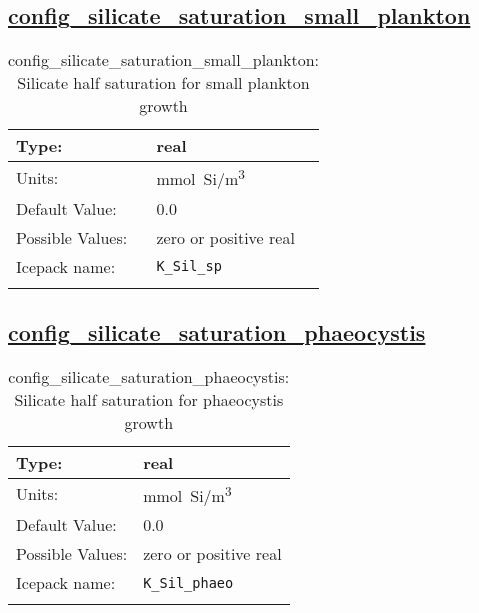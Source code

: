 \subsection[config\_silicate\_saturation\_small\_plankton]{\hyperref[sec:nm_tab_biogeochemistry]{config\_silicate\_saturation\_small\_plankton}}
\label{subsec:nm_sec_config_silicate_saturation_small_plankton}
\begin{center}
\begin{longtable}{| p{2.0in} || p{4.0in} |}
    \hline
    Type: & real \\
    \hline
    Units: & \si{mmol.Si/m^3} \\
    \hline
    Default Value: & 0.0 \\
    \hline
    Possible Values: & zero or positive real \\
    \hline
    Icepack name: & \verb+K_Sil_sp+ \\
    \hline
    \caption{config\_silicate\_saturation\_small\_plankton: Silicate half saturation for small plankton growth}
\end{longtable}
\end{center}
\subsection[config\_silicate\_saturation\_phaeocystis]{\hyperref[sec:nm_tab_biogeochemistry]{config\_silicate\_saturation\_phaeocystis}}
\label{subsec:nm_sec_config_silicate_saturation_phaeocystis}
\begin{center}
\begin{longtable}{| p{2.0in} || p{4.0in} |}
    \hline
    Type: & real \\
    \hline
    Units: & \si{mmol.Si/m^3} \\
    \hline
    Default Value: & 0.0 \\
    \hline
    Possible Values: & zero or positive real \\
    \hline
    Icepack name: & \verb+K_Sil_phaeo+ \\
    \hline
    \caption{config\_silicate\_saturation\_phaeocystis: Silicate half saturation for phaeocystis growth}
\end{longtable}
\end{center}
